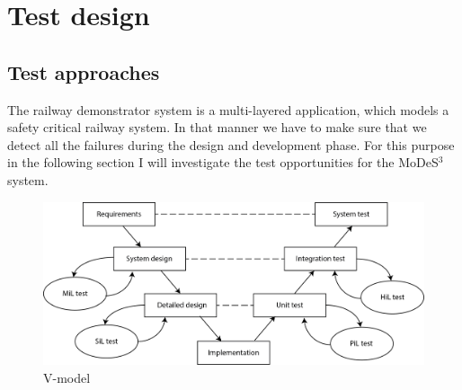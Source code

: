 \chapter{Test design}
\section{Test approaches}
The railway demonstrator system is a multi-layered application, which models a safety critical railway system. In that manner we have to make sure that we detect all the failures during the design and development phase. For this purpose in the following section I will investigate the test opportunities for the MoDeS$^3$ system.

\begin{figure}[h]
	\centering
	\includegraphics[width=150mm]{figures/testDesign/v_model.png}
	\caption{V-model}
	\label{fig:vModel}
\end{figure}

